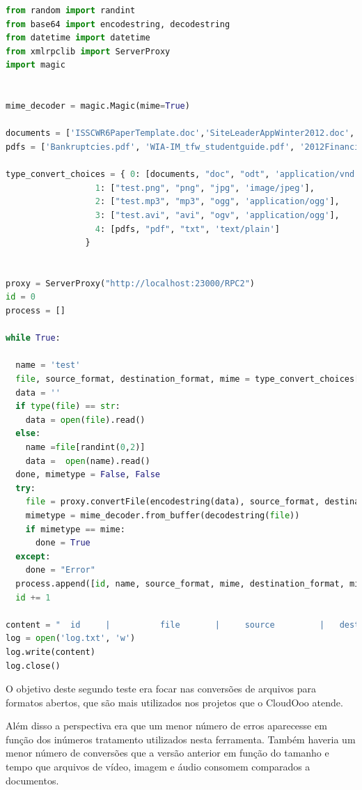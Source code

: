 \newpage
{\singlespace
\begin{lstlisting}[caption=\textit{Script} de teste,language=python,label=carga]
from random import randint
from base64 import encodestring, decodestring
from datetime import datetime
from xmlrpclib import ServerProxy
import magic


mime_decoder = magic.Magic(mime=True)

documents = ['ISSCWR6PaperTemplate.doc','SiteLeaderAppWinter2012.doc', 'Estonia.doc']
pdfs = ['Bankruptcies.pdf', 'WIA-IM_tfw_studentguide.pdf', '2012FinancialRpt.pdf']

type_convert_choices = { 0: [documents, "doc", "odt", 'application/vnd.oasis.opendocument.text'],
                  1: ["test.png", "png", "jpg", 'image/jpeg'],
                  2: ["test.mp3", "mp3", "ogg", 'application/ogg'],
                  3: ["test.avi", "avi", "ogv", 'application/ogg'],
                  4: [pdfs, "pdf", "txt", 'text/plain']
                }


proxy = ServerProxy("http://localhost:23000/RPC2")
id = 0
process = []

while True:

  name = 'test'
  file, source_format, destination_format, mime = type_convert_choices[randint(0,4)]
  data = ''
  if type(file) == str: 
    data = open(file).read()
  else:
    name =file[randint(0,2)]
    data =  open(name).read()
  done, mimetype = False, False
  try:
    file = proxy.convertFile(encodestring(data), source_format, destination_format)
    mimetype = mime_decoder.from_buffer(decodestring(file))
    if mimetype == mime:
      done = True
  except:
    done = "Error"
  process.append([id, name, source_format, mime, destination_format, mimetype, done, '\n'])
  id += 1

content = "  id     |          file       |     source         |   dest            |    done          \n" + str(process)
log = open('log.txt', 'w')
log.write(content)
log.close()

\end{lstlisting}
}

O objetivo deste segundo teste era focar nas conversões de arquivos para formatos abertos, que são mais utilizados nos projetos que o CloudOoo atende. 

Além disso a perspectiva era que um menor número de erros aparecesse em função dos inúmeros tratamento utilizados nesta ferramenta. Também haveria um menor número de conversões que a versão anterior em função do tamanho e tempo que arquivos de vídeo, imagem e áudio consomem comparados a documentos.


